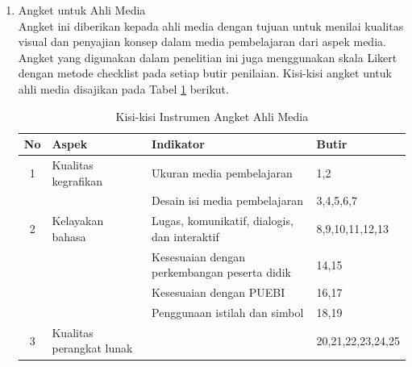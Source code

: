 \documentclass[12pt]{article}
\begin{document}
\begin{enumerate}
\begin{enumerate}
\begin{enumerate}
\begin{table}[H]
\begin{tabular}{|c|p{3cm}|p{7cm}|p{3cm}|}
                \hline
                \end{tabular}
            \end{table}
            \item Angket untuk Ahli Media\\
            \hspace*{1cm}Angket ini diberikan kepada ahli media dengan tujuan untuk menilai kualitas visual dan penyajian konsep dalam media pembelajaran dari aspek media. Angket yang digunakan dalam penelitian ini juga menggunakan skala Likert dengan metode checklist pada setiap butir penilaian. Kisi-kisi angket untuk ahli media disajikan pada Tabel \ref{kisiahlimedia} berikut.
            \begin{table}[H]
                \centering
                \caption{Kisi-kisi Instrumen Angket Ahli Media}
                \label{kisiahlimedia}
                \begin{tabular}{|c|p{4cm}|p{7cm}|p{3cm}|}
                    \hline
                    \textbf{No} & \textbf{Aspek} & \textbf{Indikator} & \textbf{Butir}\\
                    \hline
                    1 & Kualitas kegrafikan & Ukuran media pembelajaran & 1,2\\
                    && Desain isi media pembelajaran & 3,4,5,6,7\\
                    \hline
                    2 & Kelayakan bahasa & Lugas, komunikatif, dialogis, dan interaktif & 8,9,10,11,12,13\\
                    && Kesesuaian dengan perkembangan peserta didik & 14,15\\
                    && Kesesuaian dengan PUEBI & 16,17\\
                    && Penggunaan istilah dan simbol & 18,19\\
                    \hline
                    3 & Kualitas perangkat lunak & & 20,21,22,23,24,25\\
                    \hline
                    

\end{tabular}
\end{table}
\end{enumerate}
\end{enumerate}
\end{enumerate}
\end{document}

